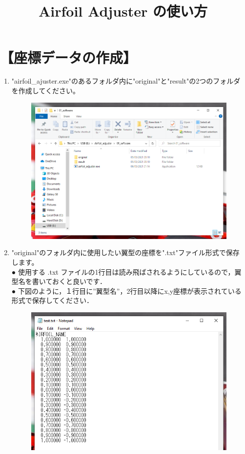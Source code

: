 \documentclass[12pt,a4paper]{jsarticle}
\title{Airfoil Adjuster の使い方}
\author{}
\date{}
\begin{document}
\maketitle
\section*{【座標データの作成】}
\begin{enumerate}
    \item "airfoil\_ajuster.exe"のあるフォルダ内に"original"と"result"の2つのフォルダを作成してください。
          \begin{figure}[htbp]
              \begin{center}
                  \includegraphics[width=110mm]{images/image_1.png}
              \end{center}
          \end{figure}
    \item "original"のフォルダ内に使用したい翼型の座標を".txt"ファイル形式で保存します。\\
          ● 使用する .txt ファイルの1行目は読み飛ばされるようにしているので，翼型名を書いておくと良いです．\\
          ● 下図のように，１行目に”翼型名”，2行目以降にx,y座標が表示されている形式で保存してください．
          \begin{figure}[htbp]
              \begin{center}
                  \includegraphics[width=110mm]{images/image_3.png}

\end{center}
\end{figure}
\end{enumerate}
\end{document}
